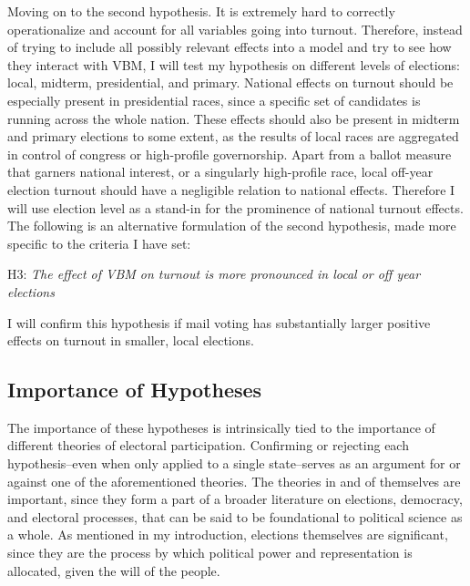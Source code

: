 \documentclass[12pt,twoside]{reedthesis}
\begin{document}
  Moving on to the second hypothesis. It is extremely hard to correctly
  operationalize and account for all variables going into turnout.
  Therefore, instead of trying to include all possibly relevant effects
  into a model and try to see how they interact with VBM, I will test my
  hypothesis on different levels of elections: local, midterm,
  presidential, and primary. National effects on turnout should be
  especially present in presidential races, since a specific set of
  candidates is running across the whole nation. These effects should also
  be present in midterm and primary elections to some extent, as the
  results of local races are aggregated in control of congress or
  high-profile governorship. Apart from a ballot measure that garners
  national interest, or a singularly high-profile race, local off-year
  election turnout should have a negligible relation to national effects.
  Therefore I will use election level as a stand-in for the prominence of
  national turnout effects. The following is an alternative formulation of
  the second hypothesis, made more specific to the criteria I have set:
  
  \begin{center}    
  H3: \textit{The  effect  of  VBM  on  turnout  is  more  pronounced  in  local  or  off year elections}
  \end{center}
  
  I will confirm this hypothesis if mail voting has substantially larger
  positive effects on turnout in smaller, local elections.
  
  \subsection{Importance of Hypotheses}\label{importance-of-hypotheses}
  
  The importance of these hypotheses is intrinsically tied to the
  importance of different theories of electoral participation. Confirming
  or rejecting each hypothesis--even when only applied to a single
  state--serves as an argument for or against one of the aforementioned
  theories. The theories in and of themselves are important, since they
  form a part of a broader literature on elections, democracy, and
  electoral processes, that can be said to be foundational to political
  science as a whole. As mentioned in my introduction, elections
  themselves are significant, since they are the process by which
  political power and representation is allocated, given the will of the
  people.
  
\end{document}
